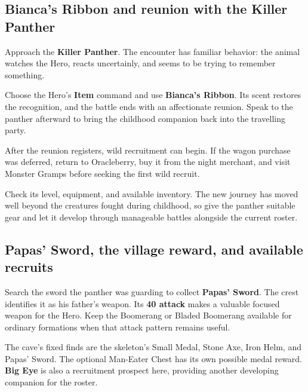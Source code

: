 \subsection{Bianca's Ribbon and reunion with the Killer Panther}

Approach the \textbf{Killer Panther}. The encounter has familiar behavior:
the animal watches the Hero, reacts uncertainly, and seems to be trying
to remember something.

Choose the Hero's \textbf{Item} command and use
\textbf{Bianca's Ribbon}. Its scent restores the recognition, and
the battle ends with an affectionate reunion. Speak to the panther
afterward to bring the childhood companion back into the travelling party.



After the reunion registers, wild recruitment can begin. If the wagon
purchase was deferred, return to Oracleberry, buy it from the night
merchant, and visit Monster Gramps before seeking the first wild recruit.

Check its level, equipment, and available inventory. The new journey
has moved well beyond the creatures fought during childhood, so give
the panther suitable gear and let it develop through manageable battles
alongside the current roster.

\subsection{Papas' Sword, the village reward, and available recruits}

Search the sword the panther was guarding to collect
\textbf{Papas' Sword}. The crest identifies it as his father's weapon.
Its \textbf{40 attack} makes a valuable focused weapon for the Hero.
Keep the Boomerang or Bladed Boomerang available for ordinary formations
when that attack pattern remains useful.

The cave's fixed finds are the skeleton's Small Medal, Stone Axe,
Iron Helm, and Papas' Sword. The optional Man-Eater Chest has its own
possible medal reward. \textbf{Big Eye} is also a recruitment prospect
here, providing another developing companion for the roster.


